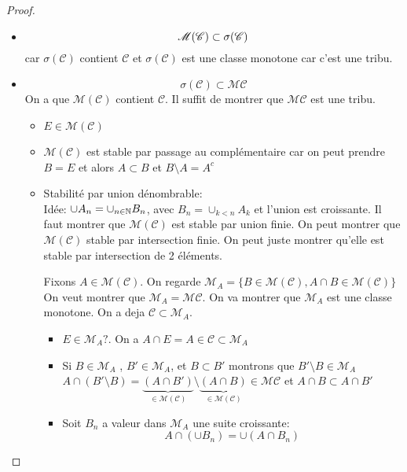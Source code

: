 \begin{proof}
	\begin{itemize}
		\item
		      $$ \mathscr{M}(\mathscr{C}) \subset \sigma(\mathscr{C}) $$
		      car $\sigma(\mathscr{C})$ contient $\mathscr{C}$ et $\sigma(\mathscr{C}) $ est une classe monotone car c'est une tribu.
		\item
		      $$\sigma(\mathscr{C})  \subset \mathscr{M}\mathscr{C}$$
		      On a  que $\mathscr{M}(\mathscr{C})$ contient $\mathscr{C}$. Il
		      suffit de montrer que $\mathscr{M}\mathscr{C}$ est une tribu. \\

		      \begin{itemize}
			      \item $E \in \mathscr{M}(\mathscr{C})$
			      \item  $\mathscr{M}(\mathscr{C})$ est stable par passage au complémentaire car
			            on peut prendre $B = E$ et alors $A \subset B$ et $B\setminus A = A^c$
			      \item Stabilité par union dénombrable: \\

			            Idée: $\cup A_n = \cup_{n\in \mathbb{N}} B_n$, avec $B_n = \cup_{k<n} A_k$ et l'union est croissante.
			            Il faut montrer que $\mathscr{M}(\mathscr{C})$ est stable par union finie.
			            On peut montrer que $\mathscr{M}(\mathscr{C})$ stable par intersection finie. On peut juste montrer qu'elle est stable par intersection de 2 éléments.

			            Fixons $A \in \mathscr{M}(\mathscr{C})$. On regarde $\mathscr{M}_A = \{B \in \mathscr{M}(\mathscr{C}) , A \cap B \in \mathscr{M}(\mathscr{C})\}$
			            On veut montrer que $\mathscr{M}_A = \mathscr{M}\mathscr{C}$.
			            On va montrer que $\mathscr{M}_A$ est une classe monotone. On a deja $\mathscr{C} \subset \mathscr{M}_A$.
			            \begin{itemize}
				            \item $E \in \mathscr{M}_A ?$.  On a $A \cap E = A \in \mathscr{C} \subset \mathscr{M}_A$
				            \item Si $B \in \mathscr{M}_A$ , $B' \in \mathscr{M}_A$, et $B \subset B'$ montrons que $B'\setminus B \in \mathscr{M}_A$
				                  $A \cap (B'\setminus B) = \underbrace{(A \cap B')}_{\in   \mathscr{M}(\mathscr{C})} \setminus \underbrace{ (A\cap B)}_{\in \mathscr{M}(\mathscr{C})} \in \mathscr{M}\mathscr{C}$
				                  et $A\cap B \subset A \cap B'$
				            \item Soit $B_n$ a valeur dans $\mathscr{M}_A$ une suite croissante:
				                  $$ A \cap (\cup B_n) = \cup (A \cap B_n)$$


\end{itemize}
\end{itemize}
\end{itemize}
\end{proof}
